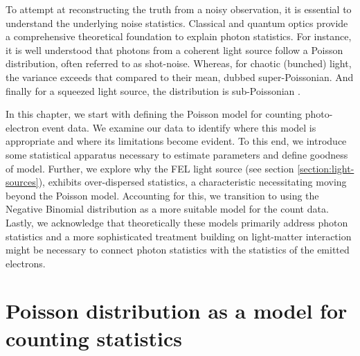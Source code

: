 To attempt at reconstructing the truth from a noisy observation, it is essential to understand the underlying noise statistics. Classical and quantum optics provide a comprehensive theoretical foundation to explain photon statistics. For instance, it is well understood that photons from a coherent light source follow a Poisson distribution, often referred to as shot-noise. Whereas, for chaotic (bunched) light, the variance exceeds that compared to their mean, dubbed super-Poissonian. And finally for a squeezed light source, the distribution is sub-Poissonian \cite[Chapter~5]{foxQuantumOpticsIntroduction2006}.

In this chapter, we start with defining the Poisson model for counting photo-electron event data. We examine our data to identify where this model is appropriate and where its limitations become evident. To this end, we introduce some statistical apparatus necessary to estimate parameters and define goodness of model. Further, we explore why the \gls{FEL} light source (see section \ref{section:light-sources}), exhibits over-dispersed statistics, a characteristic necessitating moving beyond the Poisson model. Accounting for this, we transition to using the Negative Binomial distribution as a more suitable model for the count data. Lastly, we acknowledge that theoretically these models primarily address photon statistics and a more sophisticated treatment building on light-matter interaction might be necessary to connect photon statistics with the statistics of the emitted electrons.

\section{Poisson distribution as a model for counting statistics}


